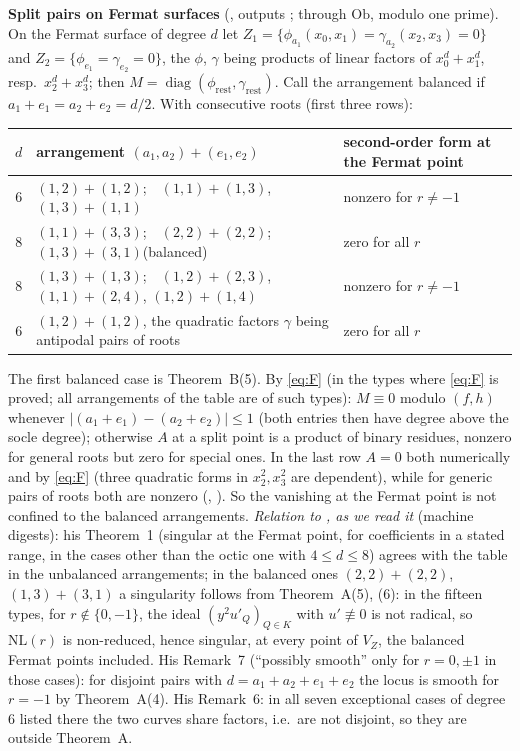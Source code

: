 \documentclass[11pt]{article}
\numberwithin{equation}{section}
\theoremstyle{remark}
\newcommand{\NL}{\mathrm{NL}}
\newcommand{\VZ}{V_Z}
\newcommand{\Ob}{\mathrm{Ob}}
\newcommand{\run}[1]{\medskip\noindent\textbf{#1}}
\begin{document}
\run{Split pairs on Fermat surfaces} (, outputs ;
through $\Ob$, modulo one prime). On the Fermat surface of degree $d$ let
$Z_1=\{\phi_{a_1}(x_0,x_1)=\gamma_{a_2}(x_2,x_3)=0\}$ and $Z_2=\{\phi_{e_1}=\gamma_{e_2}=0\}$, the $\phi$, $\gamma$
being products of linear factors of $x_0^d+x_1^d$, resp.\ $x_2^d+x_3^d$; then
$M=\operatorname{diag}(\phi_{\mathrm{rest}},\gamma_{\mathrm{rest}})$. Call the arrangement balanced if $a_1+e_1=a_2+e_2=d/2$. With consecutive roots (first three rows):
\begin{center}\footnotesize
\begin{tabular}{@{}cll@{}}
\toprule
$d$ & arrangement $(a_1,a_2)+(e_1,e_2)$ & second-order form at the Fermat point\\
\midrule
6 & $(1,2)+(1,2)$;\ \ $(1,1)+(1,3)$, $(1,3)+(1,1)$ & nonzero for $r\ne-1$\\
8 & $(1,1)+(3,3)$;\ \ $(2,2)+(2,2)$;\ \ $(1,3)+(3,1)$\quad (balanced) & zero for all
 $r$\\
8 & $(1,3)+(1,3)$;\ \ $(1,2)+(2,3)$, $(1,1)+(2,4)$, $(1,2)+(1,4)$ & nonzero for $r\ne-1$\\
6 & $(1,2)+(1,2)$, the quadratic factors $\gamma$ being antipodal pairs of roots & zero for all $r$\\
\bottomrule
\end{tabular}
\end{center}
The first balanced case is Theorem~B(5). By \eqref{eq:F} (in the types where \eqref{eq:F} is proved; all
arrangements of the table are of such types): $M\equiv0$ modulo $(f,h)$ whenever
$|(a_1+e_1)-(a_2+e_2)|\le1$ (both entries then have degree above the socle degree); otherwise $A$ at a split
point is a product of binary residues, nonzero for general roots but zero for special ones. In the last row
$A=0$ both numerically and by \eqref{eq:F} (three quadratic forms in $x_2^2,x_3^2$ are dependent), while for
generic pairs of roots both are nonzero (,
). So the vanishing at the Fermat point is not confined to the balanced
arrangements. \emph{Relation to \cite{Mo21}, as we read it} (machine digests): his Theorem~1 (singular at the Fermat point,
for coefficients in a stated range, in the cases other than the octic one with $4\le d\le8$) agrees with the
table in the unbalanced arrangements; in the balanced ones $(2,2)+(2,2)$, $(1,3)+(3,1)$ a singularity follows
from Theorem~A(5), (6): in the fifteen types, for $r\notin\{0,-1\}$, the ideal $(y^2u'_Q)_{Q\in K}$ with
$u'\not\equiv0$ is not radical, so $\NL(r)$ is non-reduced, hence singular, at every point of $\VZ$, the
balanced Fermat points included. His Remark~7 (``possibly smooth'' only for $r=0,\pm1$ in those cases): for
disjoint pairs with $d=a_1+a_2+e_1+e_2$ the locus is smooth for $r=-1$ by Theorem~A(4). His Remark~6: in all
seven exceptional cases of degree $6$ listed there the two curves share factors, i.e.\ are not disjoint, so
they are outside Theorem~A.
\end{document}

